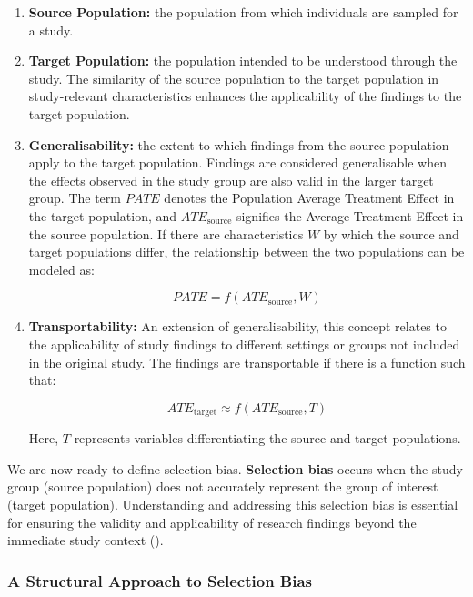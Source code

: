 \documentclass[
  singlecolumn,
  9pt]{article}
\begin{document}
\begin{enumerate}
\def\labelenumi{\arabic{enumi}.}
\item
  \textbf{Source Population:} the population from which individuals are
  sampled for a study.
\item
  \textbf{Target Population:} the population intended to be understood
  through the study. The similarity of the source population to the
  target population in study-relevant characteristics enhances the
  applicability of the findings to the target population.
\item
  \textbf{Generalisability:} the extent to which findings from the
  source population apply to the target population. Findings are
  considered generalisable when the effects observed in the study group
  are also valid in the larger target group. The term \(PATE\) denotes
  the Population Average Treatment Effect in the target population, and
  \(ATE_{\text{source}}\) signifies the Average Treatment Effect in the
  source population. If there are characteristics \(W\) by which the
  source and target populations differ, the relationship between the two
  populations can be modeled as:

  \[PATE = f(ATE_{\text{source}}, W)\]
\item
  \textbf{Transportability:} An extension of generalisability, this
  concept relates to the applicability of study findings to different
  settings or groups not included in the original study. The findings
  are transportable if there is a function such that:

  \[ATE_{\text{target}} \approx f(ATE_{\text{source}}, T)\]

  Here, \(T\) represents variables differentiating the source and target
  populations.
\end{enumerate}

We are now ready to define selection bias. \textbf{Selection bias}
occurs when the study group (source population) does not accurately
represent the group of interest (target population). Understanding and
addressing this selection bias is essential for ensuring the validity
and applicability of research findings beyond the immediate study
context ().

\subsubsection{A Structural Approach to Selection
Bias}\label{a-structural-approach-to-selection-bias}
\end{document}

